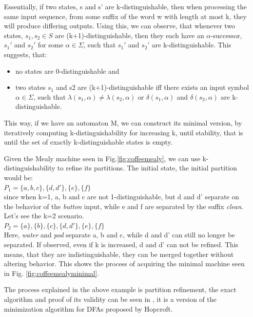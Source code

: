 Essentially, if two states, s and s' are  k-distinguishable, then when processing the same input sequence, from some suffix of the word w with length at most k, they will produce differing outputs. Using this, we can observe, that whenever two states, $s_1, s_2\in S$ are (k+1)-distinguishable, then they each have an $\alpha$-successor, $s_1'$ and $s_2'$ for some $\alpha\in\Sigma$, such that $s_1'$ and $s_2'$ are k-distinguishable. This suggests, that:
\begin{itemize}
	\item no states are 0-distinguishable and
	\item two states $s_1$ and s2 are (k+1)-distinguishable iff there exists an input symbol $\alpha\in\Sigma$, such that $\lambda(s_1, \alpha) \neq \lambda(s_2,\alpha)$ or $\delta(s_1, \alpha)$ and $\delta(s_2, \alpha)$ are k-distinguishable.\cite{Steffen2011}
\end{itemize}
This way, if we have an automaton M, we can construct its minimal version, by iteratively computing k-distinguishability for increasing k, until stability, that is until the set of exactly k-distinguishable states is empty.

\begin{example}
	Given the Mealy machine seen in Fig.\ref{fig:coffeemealy}, we can use k-distinguishability to refine its partitions. The initial state, the initial partition would be:\\
	$P_1 = \{a, b, c\}, \{d, d'\}, \{e\}, \{f\}$\\
	since when k=1, a, b and c are not 1-distinguishable, but d and d' separate on the behavior of the \textit{button} input, while e and f are separated by the suffix \textit{clean}. Let's see the k=2 scenario.\\
	$P_2 = \{a\}, \{b\}, \{c\}, \{d, d'\}, \{e\}, \{f\}$\\
	Here, \textit{water} and \textit{pod} separate a, b and c, while d and d' can still no longer be separated. If observed, even if k is increased, d and d' can not be refined. This means, that they are indistinguishable, they can be merged together without altering behavior. This shows the process of acquiring the minimal machine seen in Fig. \ref{fig:coffeemealyminimal}.
	\label{ex:partitionrefinement}
\end{example} 

The process explained in the above example is partition refinement, the exact algorithm and proof of its validity can be seen in \cite{Steffen2011}, it is a version of the minimization algorithm for DFAs proposed by Hopcroft\cite{HOPCROFT1971189}. 

